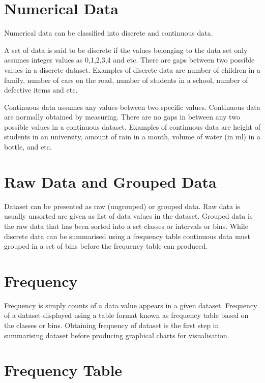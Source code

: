 \section{Numerical Data }

Numerical data can be classified into discrete and continuous data. 

A set of data is said to be discrete if the values belonging to the data set only assumes integer values as 0,1,2,3,4 and etc. There are gaps between two possible values in a discrete dataset. Examples of discrete data are number of children in a family, number of cars on the road, number of students in a school, number of defective items and etc.

Continuous data assumes any values between two specific values. Continuous data are normally obtained by measuring. There are no gaps in between any two possible values in a continuous dataset. Examples of continuous data are height of students in an university, amount of rain in a month, volume of water (in ml) in a bottle, and etc. 

\section{Raw Data and Grouped Data}
 
Dataset can be presented as raw (ungrouped) or grouped data. Raw data is usually unsorted are given as list of data values in the dataset. Grouped data is the raw data that has been sorted into a set classes or intervals or bins. While discrete data can be summarised using a frequency table continuous data must grouped in a set of bins before the frequency table can produced.


\section{Frequency}

Frequency is simply counts of a data value appears in a given dataset.  Frequency of a dataset displayed using a table format known as frequency table based on the classes or bins. Obtaining  frequency of dataset is the first step in summarising dataset before producing graphical charts for visualisation.




\section{Frequency Table}




